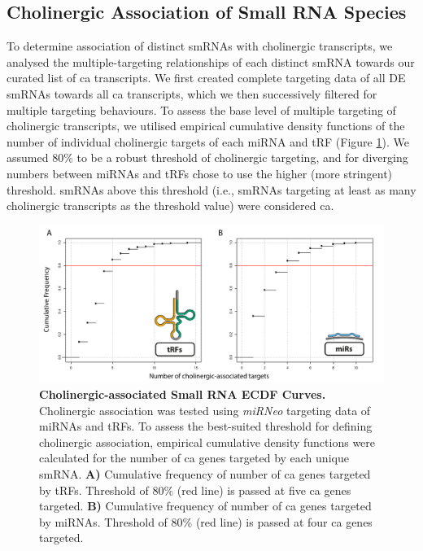 \begin{method}
\subsection{Cholinergic Association of Small RNA Species} \label{sec:stroke:chol-assoc}
To determine association of distinct smRNAs with cholinergic transcripts, we analysed the multiple-targeting relationships of each distinct smRNA towards our curated list of \ac{ca} transcripts. We first created complete targeting data of all DE smRNAs towards all \ac{ca} transcripts, which we then successively filtered for multiple targeting behaviours. To assess the base level of multiple targeting of cholinergic transcripts, we utilised empirical cumulative density functions of the number of individual cholinergic targets of each miRNA and tRF (Figure \ref{fig:cholino-ecdfs}). We assumed 80\% to be a robust threshold of cholinergic targeting, and for diverging numbers between miRNAs and tRFs chose to use the higher (more stringent) threshold. smRNAs above this threshold (i.e., smRNAs targeting at least as many cholinergic transcripts as the threshold value) were considered \ac{ca}.

\end{method}

\begin{figure}
\includegraphics[width=\textwidth]{figures/cholino-ecdfs}
\caption[Cholinergic-associated Small RNA ECDF Curves.]{\textbf{Cholinergic-associated Small RNA ECDF Curves.} Cholinergic association was tested using \emph{miRNeo} targeting data of miRNAs and tRFs. To assess the best-suited threshold for defining cholinergic association, empirical cumulative density functions were calculated for the number of \acf{ca} genes targeted by each unique smRNA. \textbf{A)} Cumulative frequency of number of \ac{ca} genes targeted by tRFs. Threshold of 80\% (red line) is passed at five \ac{ca} genes targeted. \textbf{B)} Cumulative frequency of number of \ac{ca} genes targeted by miRNAs. Threshold of 80\% (red line) is passed at four \ac{ca} genes targeted.
\label{fig:cholino-ecdfs}}
\end{figure}

